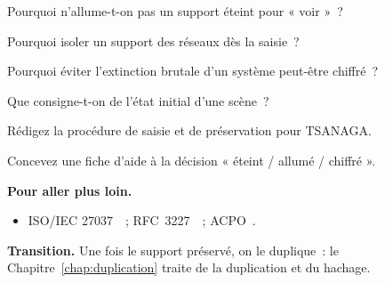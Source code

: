 \begin{boxexo}[title={\ding{45}\quad Exercice~7.5. Allumer \niveaumoyen}]
Pourquoi n'allume-t-on pas un support éteint pour « voir »~?
\end{boxexo}

\begin{boxexo}[title={\ding{45}\quad Exercice~7.6. Isoler \niveaumoyen}]
Pourquoi isoler un support des réseaux dès la saisie~?
\end{boxexo}

\begin{boxexo}[title={\ding{45}\quad Exercice~7.7. Chiffrement \niveaumoyen}]
Pourquoi éviter l'extinction brutale d'un système peut-être chiffré~?
\end{boxexo}

\begin{boxexo}[title={\ding{45}\quad Exercice~7.8. État initial \niveaumoyen}]
Que consigne-t-on de l'état initial d'une scène~?
\end{boxexo}

\begin{boxexo}[title={\ding{45}\quad Exercice~7.9. Procédure de saisie \niveauexpert}]
Rédigez la procédure de saisie et de préservation pour TSANAGA.
\end{boxexo}

\begin{boxexo}[title={\ding{45}\quad Exercice~7.10. Fiche de décision \niveauexpert}]
Concevez une fiche d'aide à la décision « éteint / allumé / chiffré ».
\end{boxexo}

\bigskip

\begin{boxinfo}
\textbf{Pour aller plus loin.}
\begin{itemize}
    \item ISO/IEC 27037~\cite{iso27037}~; RFC~3227~\cite{rfc3227}~;
          ACPO~\cite{acpo2012}.
\end{itemize}
\end{boxinfo}

\begin{boxinfo}
\textbf{Transition.} Une fois le support préservé, on le duplique~: le
Chapitre~\ref{chap:duplication} traite de la duplication et du hachage.
\end{boxinfo}

